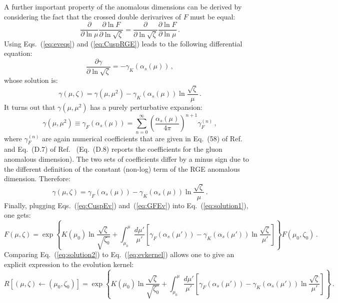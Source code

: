 \documentclass[10pt,a4paper]{article}
\begin{document}
A further important property of the anomalous dimensions can be
derived by considering the fact that the crossed double derivarives of
$F$ must be equal:
\begin{equation}
\frac{\partial}{\partial \ln \mu} \frac{\partial \ln F}{\partial \ln
  \sqrt{\zeta}} = \frac{\partial}{\partial \ln \sqrt{\zeta}} \frac{\partial \ln F}{\partial \ln
  \mu}\,.
\end{equation}
Using Eqs.~(\ref{eq:eveqs}) and (\ref{eq:CuspRGE}) leads to the
following differential equation:
\begin{equation}
\frac{\partial \gamma }{\partial \ln
  \sqrt{\zeta}} = - \gamma_K(\alpha_s(\mu))\,,
\end{equation}
whose solution is:
\begin{equation}
\gamma(\mu,\zeta) = \gamma(\mu,\mu^2) - \gamma_K(\alpha_s(\mu))\ln\frac{\sqrt{\zeta}}{\mu}\,.
\end{equation}
It turns out that $\gamma(\mu,\mu^2)$ has a purely perturbative
expansion:
\begin{equation}
  \gamma(\mu,\mu^2) \equiv \gamma_F(\alpha_s(\mu)) = \sum_{n=0}^{\infty}\left(\frac{\alpha_s(\mu)}{4\pi}\right)^{n+1}\gamma_F^{(n)}\,,
\end{equation}
where $\gamma_F^{(n)}$ are again numerical coefficients that are given
in Eq.~(58) of Ref.~\cite{Collins:2017oxh} and Eq.~(D.7) of
Ref.~\cite{Echevarria:2016scs} (Eq.~(D.8) reports the coefficients for
the gluon anomalous dimension). The two sets of coefficients differ by
a minus sign due to the different definition of the constant (non-log)
term of the RGE anomalous dimension. Therefore:
\begin{equation}\label{eq:GFEv}
\gamma(\mu,\zeta) = \gamma_F(\alpha_s(\mu)) - \gamma_K(\alpha_s(\mu))\ln\frac{\sqrt{\zeta}}{\mu}\,.
\end{equation}
Finally, plugging Eqs.~(\ref{eq:CuspEv}) and~(\ref{eq:GFEv}) into
Eq.~(\ref{eq:solution1}), one gets:
\begin{equation}\label{eq:solution2}
  F(\mu,\zeta) = \exp\left\{ K(\mu_0)\ln\frac{\sqrt{\zeta}}{\sqrt{\zeta_0}}+\int_{\mu_0}^{\mu}\frac{d\mu'}{\mu'}\left[\gamma_F(\alpha_s(\mu')) - \gamma_K(\alpha_s(\mu'))\ln\frac{\sqrt{\zeta}}{\mu'}\right]\right\}F(\mu_0,\zeta_0)\,.
\end{equation}
Comparing Eq.~(\ref{eq:solution2}) to Eq.~(\ref{eq:evkernel}) allows
one to give an explicit expression to the evolution kernel:
\begin{equation}\label{eq:evkernelexp}
  R\left[(\mu,\zeta)\leftarrow
    (\mu_0,\zeta_0)\right] = \exp\left\{ K(\mu_0)\ln\frac{\sqrt{\zeta}}{\sqrt{\zeta_0}}+\int_{\mu_0}^{\mu}\frac{d\mu'}{\mu'}\left[\gamma_F(\alpha_s(\mu')) - \gamma_K(\alpha_s(\mu'))\ln\frac{\sqrt{\zeta}}{\mu'}\right]\right\}\,.
\end{equation}
\end{document}
